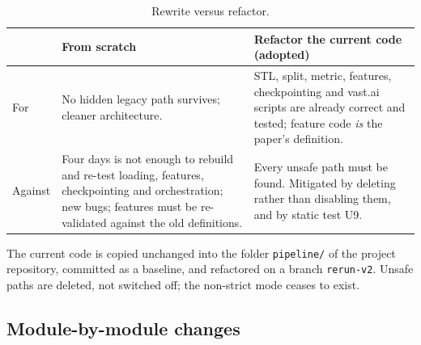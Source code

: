 \documentclass[11pt,a4paper]{article}
\newcommand{\code}[1]{\texttt{#1}}
\begin{document}
\begin{table}[h]
\centering\small
\caption{Rewrite versus refactor.}\label{tab:scratch}
\begin{tabularx}{\linewidth}{@{}l X X@{}}
\toprule
 & From scratch & Refactor the current code (adopted) \\
\midrule
For & No hidden legacy path survives; cleaner architecture. & STL, split, metric, features, checkpointing and vast.ai scripts are already correct and tested; feature code \emph{is} the paper's definition. \\
Against & Four days is not enough to rebuild and re-test loading, features, checkpointing and orchestration; new bugs; features must be re-validated against the old definitions. & Every unsafe path must be found. Mitigated by deleting rather than disabling them, and by static test U9. \\
\bottomrule
\end{tabularx}
\end{table}

The current code is copied unchanged into the folder \code{pipeline/} of the project repository,
committed as a baseline, and
refactored on a branch \code{rerun-v2}. Unsafe paths are deleted, not switched off; the non-strict
mode ceases to exist.

\subsection{Module-by-module changes}
\end{document}
